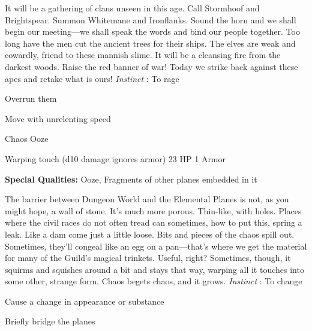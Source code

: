 \startMonsterDescription
It will be a gathering of clans unseen in this age. Call Stormhoof and Brightspear. Summon Whitemane and Ironflanks. Sound the horn and we shall begin our meeting—we shall speak the words and bind our people together. Too long have the men cut the ancient trees for their ships. The elves are weak and cowardly, friend to these mannish slime. It will be a cleansing fire from the darkest woods. Raise the red banner of war! Today we strike back against these apes and retake what is ours! {\em Instinct} : To rage
\stopMonsterDescription
       
\startitemize[1,packed]
         
\item Overrun them

         
\item Move with unrelenting speed

       
\stopitemize
       
\startMonsterName
Chaos Ooze	 
\stopMonsterName
       

Warping touch (d10 damage ignores armor)	23 HP	1 Armor

       


       
\startMonsterQualities
         {\bf Special Qualities:}  Ooze, Fragments of other planes embedded in it
\stopMonsterQualities
       
\startMonsterDescription
The barrier between Dungeon World and the Elemental Planes is not, as you might hope, a wall of stone. It’s much more porous. Thin-like, with holes. Places where the civil races do not often tread can sometimes, how to put this, spring a leak. Like a dam come just a little loose. Bits and pieces of the chaos spill out. Sometimes, they’ll congeal like an egg on a pan—that’s where we get the material for many of the Guild’s magical trinkets. Useful, right? Sometimes, though, it squirms and squishes around a bit and stays that way, warping all it touches into some other, strange form. Chaos begets chaos, and it grows. {\em Instinct} : To change
\stopMonsterDescription
       
\startitemize[1,packed]
         
\item Cause a change in appearance or substance

         
\item Briefly bridge the planes

       
\stopitemize
       

